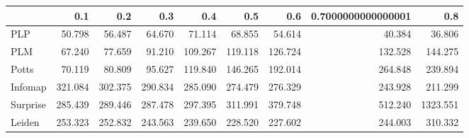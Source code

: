 \begin{tabular}{lrrrrrrrr}
\toprule
{} &     0.1 &     0.2 &     0.3 &     0.4 &     0.5 &     0.6 & 0.7000000000000001 &      0.8 \\
\midrule
PLP      &  50.798 &  56.487 &  64.670 &  71.114 &  68.855 &  54.614 &             40.384 &   36.806 \\
PLM      &  67.240 &  77.659 &  91.210 & 109.267 & 119.118 & 126.724 &            132.528 &  144.275 \\
Potts    &  70.119 &  80.809 &  95.627 & 119.840 & 146.265 & 192.014 &            264.848 &  239.894 \\
Infomap  & 321.084 & 302.375 & 290.834 & 285.090 & 274.479 & 276.329 &            243.928 &  211.299 \\
Surprise & 285.439 & 289.446 & 287.478 & 297.395 & 311.991 & 379.748 &            512.240 & 1323.551 \\
Leiden   & 253.323 & 252.832 & 243.563 & 239.650 & 228.520 & 227.602 &            244.003 &  310.332 \\
\bottomrule
\end{tabular}
